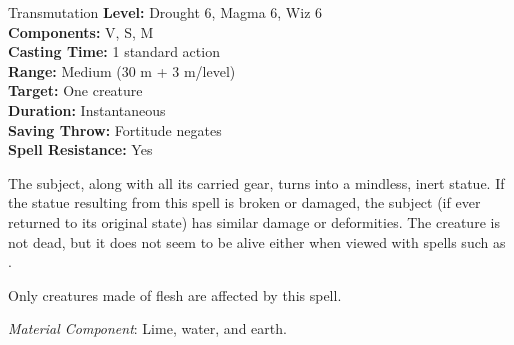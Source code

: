 {Transmutation}
{
	\textbf{Level:}
	Drought 6, Magma 6, Wiz 6\\
	\textbf{Components:}
	V, S, M\\
	\textbf{Casting Time:}
	1 standard action\\
	\textbf{Range:}
	Medium (30 m + 3 m/level)\\
	\textbf{Target:}
	One creature\\
	\textbf{Duration:}
	Instantaneous\\
	\textbf{Saving Throw:}
	Fortitude negates\\
	\textbf{Spell Resistance:}
	Yes\\
}
{
	The subject, along with all its carried gear, turns into a mindless, inert statue. If the statue resulting from this spell is broken or damaged, the subject (if ever returned to its original state) has similar damage or deformities. The creature is not dead, but it does not seem to be alive either when viewed with spells such as .

	Only creatures made of flesh are affected by this spell.

	\textit{Material Component}:
	Lime, water, and earth.

}
